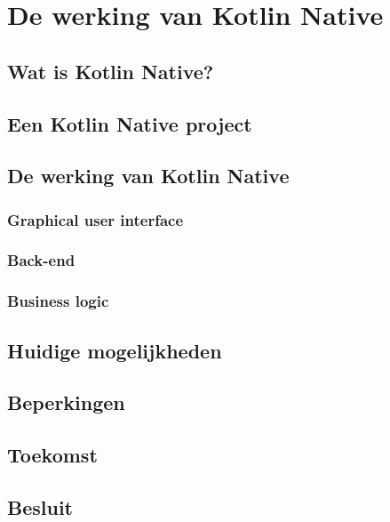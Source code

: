 
\chapter{De werking van Kotlin Native}
\label{ch:kotlinnative}
\section{Wat is Kotlin Native?}
\section{Een Kotlin Native project}
\section{De werking van Kotlin Native}
\subsection{Graphical user interface}
\subsection{Back-end}
\subsection{Business logic}
\section{Huidige mogelijkheden}
\section{Beperkingen}
\section{Toekomst}
\section{Besluit}

